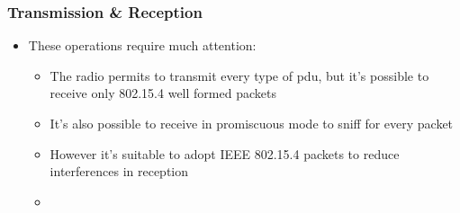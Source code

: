 \begin{frame}[fragile]
  \frametitle{Transmission \& Reception}
  \begin{itemize}
    \item These operations require much attention:
    \begin{itemize}
    	\item The radio permits to transmit every type of pdu, but it's possible to receive only 802.15.4 well formed packets
    	\item It's also possible to receive in promiscuous mode to sniff for every packet
    	\item However it's suitable to adopt IEEE 802.15.4 packets to reduce interferences in reception
    	\item 
    \end{itemize}
    
  \end{itemize}
\end{frame}